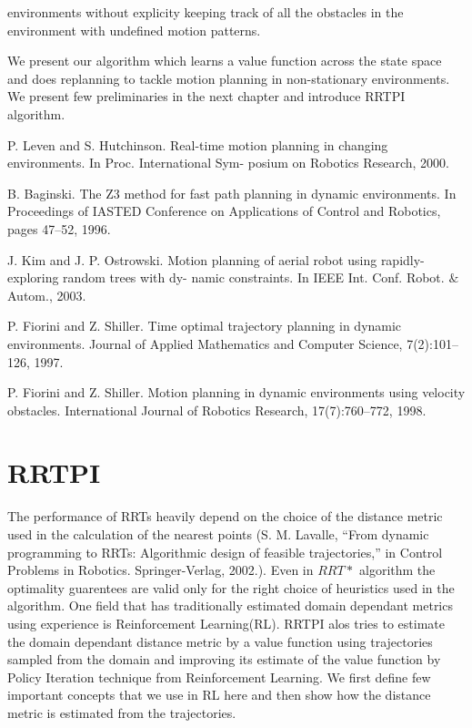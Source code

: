 \documentclass[MTech]{iitmdiss}
\begin{document}
environments without explicity keeping track of all the obstacles in the environment with undefined motion patterns.
 
We present our algorithm which learns a value function across the state space and does replanning to tackle motion planning in non-stationary environments. We present few preliminaries in the next chapter and introduce RRTPI algorithm.
 
 
P. Leven and S. Hutchinson. Real-time motion planning in changing environments. In Proc. International Sym- posium on Robotics Research, 2000. 
 
 B. Baginski. The Z3 method for fast path planning in dynamic environments. In Proceedings of IASTED Conference on Applications of Control and Robotics, pages 47–52, 1996.
 
 J. Kim and J. P. Ostrowski. Motion planning of aerial robot using rapidly-exploring random trees with dy- namic constraints. In IEEE Int. Conf. Robot. $\&$ Autom., 2003.
 
P. Fiorini and Z. Shiller. Time optimal trajectory planning in dynamic environments. Journal of Applied Mathematics and Computer Science, 7(2):101–126, 1997.

P. Fiorini and Z. Shiller. Motion planning in dynamic environments using velocity obstacles. International Journal of Robotics Research, 17(7):760–772, 1998. 
 
 
\chapter{RRTPI}

The performance of RRTs heavily depend on the choice of the distance metric used in the calculation of the nearest points (S. M. Lavalle, “From dynamic programming to RRTs: Algorithmic design of feasible trajectories,” in Control Problems in Robotics.
Springer-Verlag, 2002.). Even in $RRT*$ algorithm the optimality guarentees are valid only for the right choice of heuristics used in the algorithm. One field that has traditionally estimated domain dependant metrics using experience is Reinforcement Learning(RL). RRTPI alos tries to estimate the domain dependant distance metric by a value function using trajectories sampled from the domain and improving its estimate of the value function by Policy Iteration technique from Reinforcement Learning. We first define few important concepts that we use in RL here and then show how the distance metric is estimated from the trajectories. 
\end{document}
